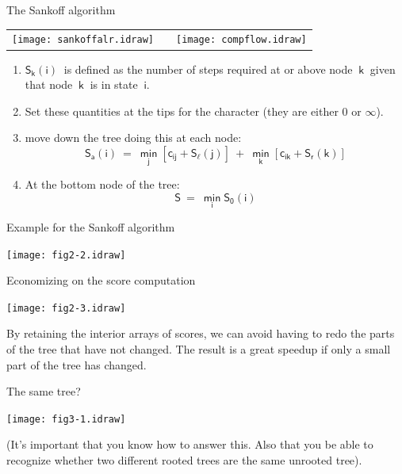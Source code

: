 \documentclass[bluish,slideColor,colorBG,pdf]{prosper}
\begin{document}
\begin{slide}[Replace]{The Sankoff algorithm}

\begin{center}
\begin{tabular}{c c c}
\texttt{[image: sankoffalr.idraw]} &
\hspace{0.5in} &
\texttt{[image: compflow.idraw]}
\end{tabular}
\end{center}

\begin{enumerate}
\setlength{\itemsep}{4pt}
\item $\mathsf{S_k(i)~}$ is defined as the number of steps required at or above
node $\mathsf{~k~}$ given that node $\mathsf{~k~}$ is in state $\mathsf{~i}$.
\item Set these quantities at the tips for the character (they are either 0 or $\infty$).
\item move down the tree doing this at each node:
\[
\mathsf{S_a(i) \  = \  \min_j \left[ c_{ij} + S_\ell(j)\right] \ + \  \min_k
\left[ c_{ik}
+ S_r(k)\right]}
\]
\item At the bottom node of the tree:
\[
\mathsf{S \ = \ \min_i S_0(i)}
\]
\end{enumerate}

\end{slide}

\begin{slide}[Replace]{Example for the Sankoff algorithm}

\centerline{\texttt{[image: fig2-2.idraw]}}

\end{slide}

\begin{slide}[Replace]{Economizing on the score computation}

\centerline{\texttt{[image: fig2-3.idraw]}}
\bigskip

By retaining the interior arrays of scores, we can avoid having to
redo the parts of the tree that have not changed.  The result is a
great speedup if only a small part of the tree has changed.

\end{slide}

\begin{slide}[Replace]{The same tree? }

\centerline{\texttt{[image: fig3-1.idraw]}}
\bigskip

(It's important that you know how to answer this.  Also that you be able
to recognize whether two different rooted trees are the same unrooted tree).

\end{slide}
\end{document}
